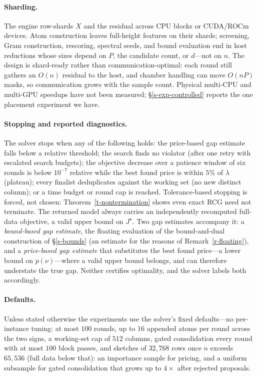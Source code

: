 \documentclass[12pt]{article}
\theoremstyle{plain}
\theoremstyle{definition}
\begin{document}
\paragraph{Sharding.}
The engine row-shards $X$ and the residual across CPU blocks or
CUDA/ROCm devices. Atom construction leaves full-height features on their
shards; screening, Gram construction, rescoring, spectral seeds, and bound
evaluation end in host reductions whose sizes depend on $P$, the candidate
count, or $d$---not on $n$. The design is shard-ready rather than
communication-optimal: each round still gathers an $O(n)$ residual to the
host, and chamber handling can move $O(nP)$ masks, so communication grows
with the sample count. Physical multi-CPU and multi-GPU speedups have not
been measured; \S\ref{s-exp-controlled} reports the one placement experiment
we have.

\paragraph{Stopping and reported diagnostics.}
The solver stops when any of the following holds: the price-based gap
estimate falls below a relative threshold; the search finds no violator (after
one retry with escalated search budgets); the objective decrease over a patience window of six
rounds is below $10^{-7}$ relative while the best found price is within $5\%$
of $\lambda$ (plateau); every finalist deduplicates against the working set
(no new distinct column); or a time budget or round cap is reached.
Tolerance-based stopping is forced, not chosen: Theorem~\ref{t-nontermination}
shows even exact RCG need not terminate. The returned model always carries an
independently recomputed full-data objective, a valid upper bound on
$J^\star$. Two gap estimates accompany it: a \emph{bound-based gap estimate}, the
floating evaluation of the bound-and-dual construction of \S\ref{s-bounds}
(an estimate for the reasons of Remark~\ref{r-floating}), and a
\emph{price-based gap estimate} that substitutes the best found price---a
lower bound on $p(\nu)$---where a valid upper bound belongs, and can
therefore understate the true gap. Neither
certifies optimality, and the solver labels both accordingly.

\paragraph{Defaults.}
Unless stated otherwise the experiments use the solver's fixed defaults---no
per-instance tuning: at most $100$ rounds, up to $16$ appended atoms per
round across the two signs, a working-set cap of $512$ columns, gated
consolidation every round with at most $100$ block passes, and sketches of
$32{,}768$ rows once $n$ exceeds $65{,}536$ (full data below that): an
importance sample for pricing, and a uniform subsample for gated
consolidation that grows up to $4\times$ after rejected proposals.
\end{document}
